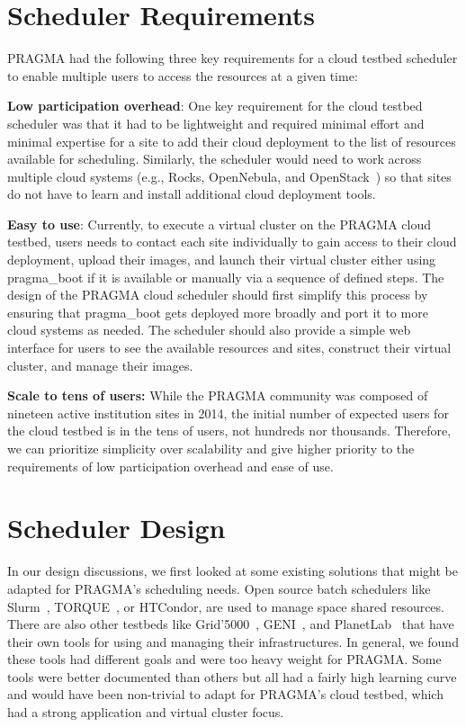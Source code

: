 \documentclass[times]{cpeauth}
\begin{document}
\section{Scheduler Requirements}

PRAGMA had the following three key requirements for a cloud testbed scheduler to enable multiple users to access the resources at a  given time:

\textbf{Low participation overhead}:  One key requirement for the cloud testbed scheduler was that it had to be lightweight and required  minimal effort and minimal expertise for a site to add their cloud deployment to the list of resources available for scheduling.   Similarly, the scheduler would need to work across multiple cloud systems (e.g., Rocks, OpenNebula, and OpenStack~\cite{openstack}) so that sites do not have to learn and install additional cloud deployment tools. 

\textbf{Easy to use}:  Currently, to execute a virtual cluster on the PRAGMA cloud testbed, users needs to contact each site individually to gain access to their cloud deployment, upload their images, and launch their virtual cluster either using pragma\_boot  if it is available or manually via a sequence of defined steps.   The design of the PRAGMA cloud scheduler should first simplify this process by ensuring that pragma\_boot gets deployed more broadly and port it to more cloud systems as needed.   The scheduler should also provide a simple web interface for users to see the available resources and sites, construct their virtual cluster, and manage their images.

\textbf{Scale to tens of users:}  While the PRAGMA community was composed of nineteen active institution sites in 2014, the initial number of expected users for the cloud testbed is in the tens of users, not hundreds nor thousands.  Therefore, we can prioritize simplicity over scalability and give higher priority to the requirements of low participation overhead and ease of use.

\section{Scheduler Design}
\label{Sec:Design}

In our design discussions, we first looked at some existing solutions that might be adapted for PRAGMA's scheduling needs.  Open source batch schedulers like Slurm~\cite{slurm}, TORQUE~\cite{torque}, or HTCondor, are used to manage space shared resources.  There are also other testbeds like Grid'5000~\cite{grid5000},  GENI~\cite{geni}, and PlanetLab~\cite{planetlab} that have their own tools for using and managing their infrastructures. In general, we found these tools had different goals and were too heavy weight for PRAGMA.  Some tools were better documented than others but all had a fairly high learning curve and would have been non-trivial to adapt for PRAGMA's cloud testbed, which had a strong application and virtual cluster focus.
\end{document}
